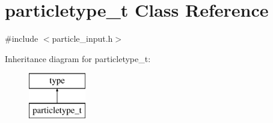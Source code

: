 \hypertarget{classparticletype__t}{}\section{particletype\+\_\+t Class Reference}
\label{classparticletype__t}


{\ttfamily \#include $<$particle\+\_\+input.\+h$>$}

Inheritance diagram for particletype\+\_\+t\+:\begin{figure}[H]
\begin{center}
\leavevmode
\includegraphics[height=2.000000cm]{classparticletype__t}
\end{center}
\end{figure}
